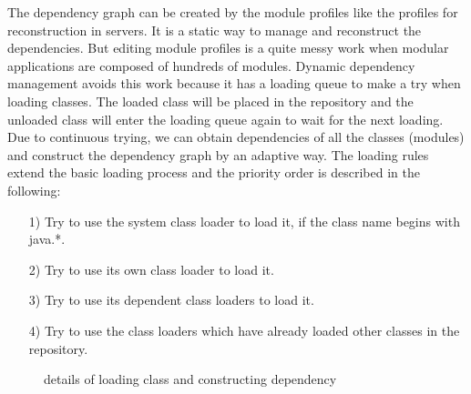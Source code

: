 \documentclass[conference]{IEEEtran}
\begin{document}
The dependency graph can be created by the module profiles like the profiles for reconstruction in servers.
It is a static way to manage and reconstruct the dependencies.
But editing module profiles is a quite messy work when modular applications are composed of hundreds of modules.
Dynamic dependency management avoids this work because it has a loading queue to make a try when loading classes.
The loaded class will be placed in the repository and the unloaded class will enter the loading queue again to wait for the next loading.
Due to continuous trying, we can obtain dependencies of all the classes (modules) and construct the dependency graph by an adaptive way.
The loading rules extend the basic loading process and the priority order is described in the following: 
\begin{itemize}[]
\item[1)] Try to use the system class loader to load it, if the class name begins with java.*.
\item[2)] Try to use its own class loader to load it.
\item[3)] Try to use its dependent class loaders to load it.
\item[4)] Try to use the class loaders which have already loaded other classes in the repository. 
\end{itemize}

\begin{figure}[ht]
\centering
{}
\hfil
{}
\hfil
{}
\caption{details of loading class and constructing dependency}
\label{fig:loading_queue}
\end{figure}
\end{document}
